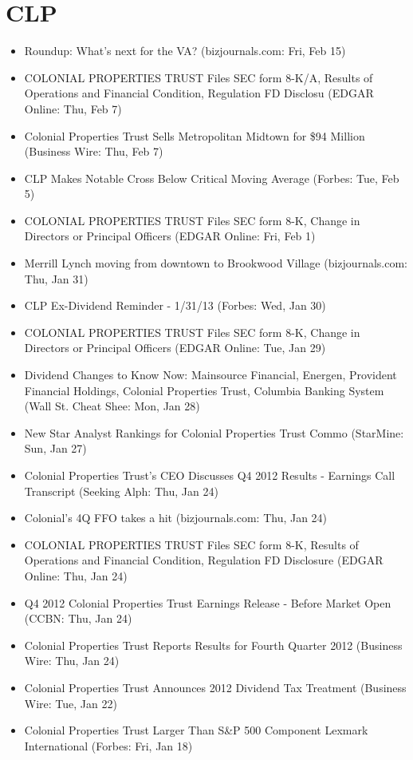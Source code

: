 \documentclass[11pt,asymmetric]{article}
\begin{document}
\section*{CLP}
\begin{itemize}
\item Roundup: What's next for the VA? (bizjournals.com: Fri, Feb 15)
\item COLONIAL PROPERTIES TRUST Files SEC form 8-K/A, Results of Operations and Financial Condition, Regulation FD Disclosu (EDGAR Online: Thu, Feb 7)
\item Colonial Properties Trust Sells Metropolitan Midtown for \$94 Million (Business Wire: Thu, Feb 7)
\item CLP Makes Notable Cross Below Critical Moving Average (Forbes: Tue, Feb 5)
\item COLONIAL PROPERTIES TRUST Files SEC form 8-K, Change in Directors or Principal Officers (EDGAR Online: Fri, Feb 1)
\item Merrill Lynch moving from downtown to Brookwood Village (bizjournals.com: Thu, Jan 31)
\item CLP Ex-Dividend Reminder - 1/31/13 (Forbes: Wed, Jan 30)
\item COLONIAL PROPERTIES TRUST Files SEC form 8-K, Change in Directors or Principal Officers (EDGAR Online: Tue, Jan 29)
\item Dividend Changes to Know Now: Mainsource Financial, Energen, Provident Financial Holdings, Colonial Properties Trust, Columbia Banking System (Wall St. Cheat Shee: Mon, Jan 28)
\item New Star Analyst Rankings for Colonial Properties Trust Commo (StarMine: Sun, Jan 27)
\item Colonial Properties Trust's CEO Discusses Q4 2012 Results - Earnings Call Transcript (Seeking Alph: Thu, Jan 24)
\item Colonial's 4Q FFO takes a hit (bizjournals.com: Thu, Jan 24)
\item COLONIAL PROPERTIES TRUST Files SEC form 8-K, Results of Operations and Financial Condition, Regulation FD Disclosure (EDGAR Online: Thu, Jan 24)
\item Q4 2012 Colonial Properties Trust Earnings Release - Before Market Open (CCBN: Thu, Jan 24)
\item Colonial Properties Trust Reports Results for Fourth Quarter 2012 (Business Wire: Thu, Jan 24)
\item Colonial Properties Trust Announces 2012 Dividend Tax Treatment (Business Wire: Tue, Jan 22)
\item Colonial Properties Trust Larger Than S\&P 500 Component Lexmark International (Forbes: Fri, Jan 18)

\end{itemize}
\end{document}
